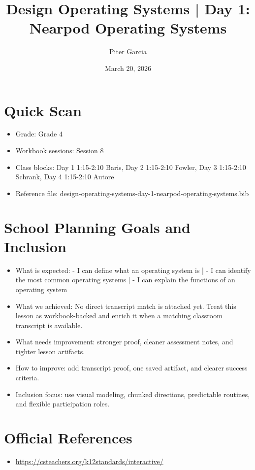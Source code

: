 \documentclass[11pt]{article}
\title{Design Operating Systems | Day 1: Nearpod Operating Systems}
\author{Piter Garcia}
\date{March 20, 2026}
\begin{document}
\maketitle
\section*{Quick Scan}
\begin{itemize}[leftmargin=*]
\item Grade: Grade 4
\item Workbook sessions: Session 8
\item Class blocks: Day 1 1:15-2:10 Baris, Day 2 1:15-2:10 Fowler, Day 3 1:15-2:10 Schrank, Day 4 1:15-2:10 Autore
\item Reference file: design-operating-systems-day-1-nearpod-operating-systems.bib
\end{itemize}
\section*{School Planning Goals and Inclusion}
\begin{itemize}[leftmargin=*]
\item What is expected: - I can define what an operating system is | - I can identify the most common operating systems | - I can explain the functions of an operating system
\item What we achieved: No direct transcript match is attached yet. Treat this lesson as workbook-backed and enrich it when a matching classroom transcript is available.
\item What needs improvement: stronger proof, cleaner assessment notes, and tighter lesson artifacts.
\item How to improve: add transcript proof, one saved artifact, and clearer success criteria.
\item Inclusion focus: use visual modeling, chunked directions, predictable routines, and flexible participation roles.
\end{itemize}
\section*{Official References}
\begin{itemize}[leftmargin=*]
\item \url{https://csteachers.org/k12standards/interactive/}

\end{itemize}
\end{document}
